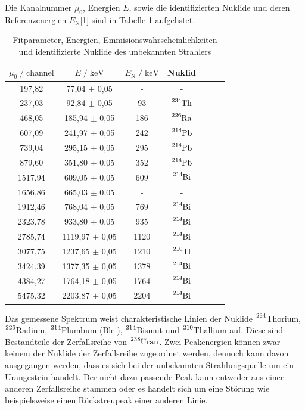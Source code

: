 Die Kanalnummer $\mu_0$, Energien $E$, sowie die identifizierten Nuklide und deren Referenzenergien $E_\text{N}$[1]
sind in Tabelle \ref{tab:mess7} aufgelistet. \\

\begin{table}
  \centering
  \caption{Fitparameter, Energien, Emmisionswahrscheinlichkeiten und identifizierte Nuklide des unbekannten Strahlers}
  \label{tab:mess7}
  \begin{tabular}{c c c c c c c}
  \toprule
  $\mu_0 \;/\; \text{channel}$ & $E \;/\; \si{\kilo\eV}$ & $E_\text{N} \;/\; \si{\kilo\eV}$ & Nuklid \\
  \midrule
   197,82 &   77,04 $\pm$ 0,05 &    - &               - \\
   237,03 &   92,84 $\pm$ 0,05 &   93 & $\ce{^{234}Th}$ \\
   468,05 &  185,94 $\pm$ 0,05 &  186 & $\ce{^{226}Ra}$ \\
   607,09 &  241,97 $\pm$ 0,05 &  242 & $\ce{^{214}Pb}$ \\
   739,04 &  295,15 $\pm$ 0,05 &  295 & $\ce{^{214}Pb}$ \\  
   879,60 &  351,80 $\pm$ 0,05 &  352 & $\ce{^{214}Pb}$ \\
  1517,94 &  609,05 $\pm$ 0,05 &  609 & $\ce{^{214}Bi}$ \\
  1656,86 &  665,03 $\pm$ 0,05 &    - &               - \\
  1912,46 &  768,04 $\pm$ 0,05 &  769 & $\ce{^{214}Bi}$ \\
  2323,78 &  933,80 $\pm$ 0,05 &  935 & $\ce{^{214}Bi}$ \\
  2785,74 & 1119,97 $\pm$ 0,05 & 1120 & $\ce{^{214}Bi}$ \\
  3077,75 & 1237,65 $\pm$ 0,05 & 1210 & $\ce{^{210}Tl}$ \\
  3424,39 & 1377,35 $\pm$ 0,05 & 1378 & $\ce{^{214}Bi}$ \\
  4384,27 & 1764,18 $\pm$ 0,05 & 1764 & $\ce{^{214}Bi}$ \\
  5475,32 & 2203,87 $\pm$ 0,05 & 2204 & $\ce{^{214}Bi}$ \\
  \bottomrule
  \end{tabular}
\end{table}


Das gemessene Spektrum weist charakteristische Linien der Nuklide
$\ce{^{234}}$Thorium, $\ce{^{226}}$Radium, $\ce{^{214}}$Plumbum (Blei), $\ce{^{214}}$Bismut und
$\ce{^{210}}$Thallium auf. Diese sind Bestandteile der Zerfallsreihe von $\ce{^{238}Uran}$.
Zwei Peakenergien können zwar keinem der Nuklide der Zerfallsreihe zugeordnet werden, dennoch kann davon ausgegangen
werden, dass es sich bei der unbekannten Strahlungsquelle um ein Urangestein handelt.
Der nicht dazu passende Peak kann entweder aus einer anderen Zerfallsreihe stammen oder es handelt sich um eine Störung
wie beispielsweise einen Rückstreupeak einer anderen Linie.


